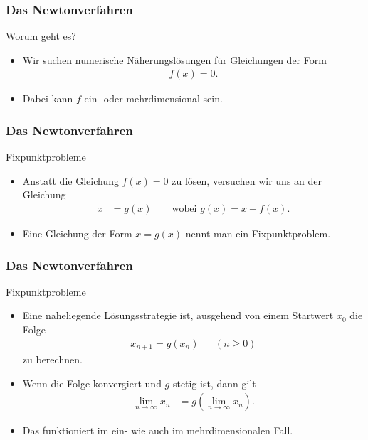 \documentclass{beamer}
\title[Annuma]{\mytitle}
\author[Amin Coja-Oghlan]{Amin Coja-Oghlan}
\institute[Frankfurt]{JWGUFFM}
\date{}
\newcommand\bc[1]{\left({#1}\right)}
\renewcommand{\ae}{\"a}
\renewcommand{\oe}{\"o}
\newcommand{\ue}{\"u}
\newcommand{\mytitle}{Das Newtonverfahren}
\begin{document}
\frame[plain]{\titlepage}

\begin{frame}\frametitle{\mytitle}
	\begin{block}{Worum geht es?}
		\begin{itemize}
			\item Wir suchen numerische N\ae herungsl\oe sungen f\ue r Gleichungen der Form
				\begin{align*}
					f(x)=0.
				\end{align*}
			\item Dabei kann $f$ ein- oder mehrdimensional sein.
		\end{itemize}
	\end{block}
\end{frame}

\begin{frame}\frametitle{\mytitle}
	\begin{block}{Fixpunktprobleme}
		\begin{itemize}
			\item Anstatt die Gleichung $f(x)=0$ zu l\oe sen, versuchen wir uns an der Gleichung
				\begin{align*}
					x&=g(x)\qquad\mbox{wobei }g(x)=x+f(x).
				\end{align*}
			\item Eine Gleichung der Form $x=g(x)$ nennt man ein \alert{Fixpunktproblem}.
		\end{itemize}
	\end{block}
\end{frame}

\begin{frame}\frametitle{\mytitle}
	\begin{block}{Fixpunktprobleme}
		\begin{itemize}
			\item Eine naheliegende L\oe sungsstrategie ist, ausgehend von einem Startwert $x_0$ die Folge
				\begin{align*}
					x_{n+1}=g(x_n)&&(n\geq0)
				\end{align*}
				zu berechnen.
			\item Wenn die Folge konvergiert und $g$ stetig ist, dann gilt
				\begin{align*}
					\lim_{n\to\infty}x_n&=g\bc{\lim_{n\to\infty}x_n}.
				\end{align*}
			\item Das funktioniert im ein- wie auch im mehrdimensionalen Fall.
		\end{itemize}
	\end{block}
\end{frame}
\end{document}
